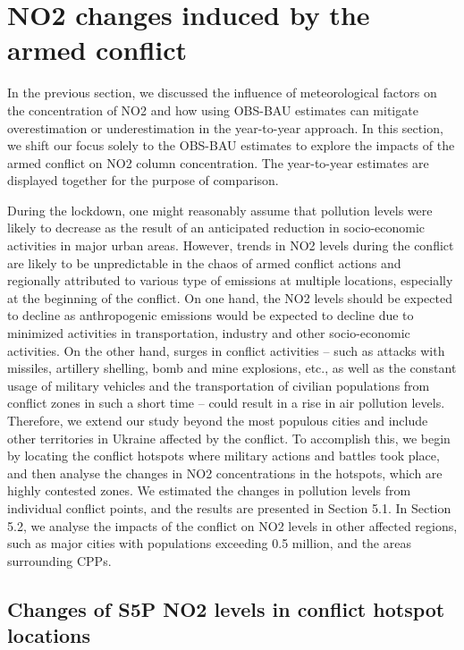 \section{NO2 changes induced by the armed conflict} \label{chap3_war}
In the previous section, we discussed the influence of meteorological factors on the concentration of NO2 and how using OBS-BAU estimates can mitigate overestimation or underestimation in the year-to-year approach. In this section, we shift our focus solely to the OBS-BAU estimates to explore the impacts of the armed conflict on NO2 column concentration. The year-to-year estimates are displayed together for the purpose of comparison.\par

During the lockdown, one might reasonably assume that pollution levels were likely to decrease as the result of an anticipated reduction in socio-economic activities in major urban areas. However, trends in NO2 levels during the conflict are likely to be unpredictable in the chaos of armed conflict actions and regionally attributed to various type of emissions at multiple locations, especially at the beginning of the conflict. On one hand, the NO2 levels should be expected to decline as anthropogenic emissions would be expected to decline due to minimized activities in transportation, industry and other socio-economic activities. On the other hand, surges in conflict activities – such as attacks with missiles, artillery shelling, bomb and mine explosions, etc., as well as the constant usage of military vehicles and the transportation of civilian populations from conflict zones in such a short time – could result in a rise in air pollution levels. Therefore, we extend our study beyond the most populous cities and include other territories in Ukraine affected by the conflict. To accomplish this, we begin by locating the conflict hotspots where military actions and battles took place, and then analyse the changes in NO2 concentrations in the hotspots, which are highly contested zones. We estimated the changes in pollution levels from individual conflict points, and the results are presented in Section 5.1. In Section 5.2, we analyse the impacts of the conflict on NO2 levels in other affected regions, such as major cities with populations exceeding 0.5 million, and the areas surrounding CPPs.\par
\subsection{Changes of S5P NO2 levels in conflict hotspot locations}
